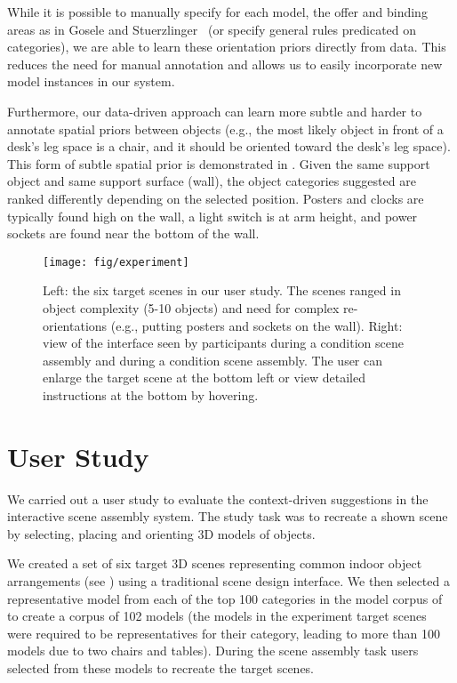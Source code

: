 \documentclass{sigchi}
\begin{document}
While it is possible to manually specify for each model, the offer and binding areas as in Gosele and Stuerzlinger~\cite{gosele1999semantic} (or specify general rules predicated on categories), we are able to learn these orientation priors directly from data. This reduces the need for manual annotation and allows us to easily incorporate new model instances in our system.

Furthermore, our data-driven approach can learn more subtle and harder to annotate spatial priors between objects (e.g., the most likely object in front of a desk's leg space is a chair, and it should be oriented toward the desk's leg space).  This form of subtle spatial prior is demonstrated in .  Given the same support object and same support surface (wall), the object categories suggested are ranked differently depending on the selected position.  Posters and clocks are typically found high on the wall, a light switch is at arm height, and power sockets are found near the bottom of the wall.


\begin{figure*}
    \texttt{[image: fig/experiment]}
    \caption{Left: the six target scenes in our user study.  The scenes ranged in object complexity (5-10 objects) and need for complex re-orientations (e.g., putting posters and sockets on the wall). Right: view of the interface seen by participants during a \none condition scene assembly and during a \full condition scene assembly.  The user can enlarge the target scene at the bottom left or view detailed instructions at the bottom by hovering.}
    \label{fig:experiment}
\end{figure*}

\section{User Study}

We carried out a user study to evaluate the context-driven suggestions in the \SceneSuggest interactive scene assembly system.  The study task was to recreate a shown scene by selecting, placing and orienting 3D models of objects.

We created a set of six target 3D scenes representing common indoor object arrangements (see ) using a traditional scene design interface.  We then selected a representative model from each of the top 100 categories in the model corpus of \cite{savva2015semgeo} to create a corpus of 102 models (the models in the experiment target scenes were required to be representatives for their category, leading to more than 100 models due to two chairs and tables).  During the scene assembly task users selected from these models to recreate the target scenes.
\end{document}
